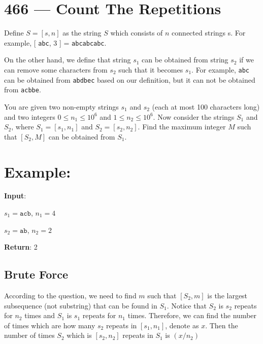 \section{466 --- Count The Repetitions}
Define $S = [s,n]$ as the string $S$ which consists of $n$ connected strings s. For example, [ \texttt{abc}, 3 ] = \texttt{abcabcabc}.

On the other hand, we define that string $s_1$ can be obtained from string $s_2$ if we can remove some characters from $ s_2 $ such that it becomes $ s_1 $. For example, \texttt{abc} can be obtained from \texttt{abdbec} based on our definition, but it can not be obtained from \texttt{acbbe}.

You are given two non-empty strings $ s_1 $ and $ s_2 $ (each at most 100 characters long) and two integers $0 \leq n_1 \leq 10^6$ and $1 \leq n_2 \leq 10^6$. Now consider the strings $S_1$ and $S_2$, where $S_1=[s_1,n_1]$ and $S_2=[s_2,n_2]$. Find the maximum integer $M$ such that $[S_2,M]$ can be obtained from $S_1$.

\section{Example:}

\begin{flushleft}
\textbf{Input}:

$s_1=\texttt{acb}$, $n_1=4$

$s_2=\texttt{ab}$, $n_2=2$

\textbf{Return}: 2

\end{flushleft}

\subsection{Brute Force}
According to the question, we need to find $m$ such that $[S_2,m]$ is the largest subsequence (not substring) that can be found in $S_1$. Notice that $S_2$ is $s_2$ repeats for $n_2$ times and $S_1$ is $s_1$ repeats for $n_1$ times. Therefore, we can find the number of times which are how many $s_2$ repeats in $[s_1,n_1]$, denote as $x$. Then the number of times $S_2$ which is $[s_2,n_2]$ repeats in $S_1$ is $(x/n_2)$

